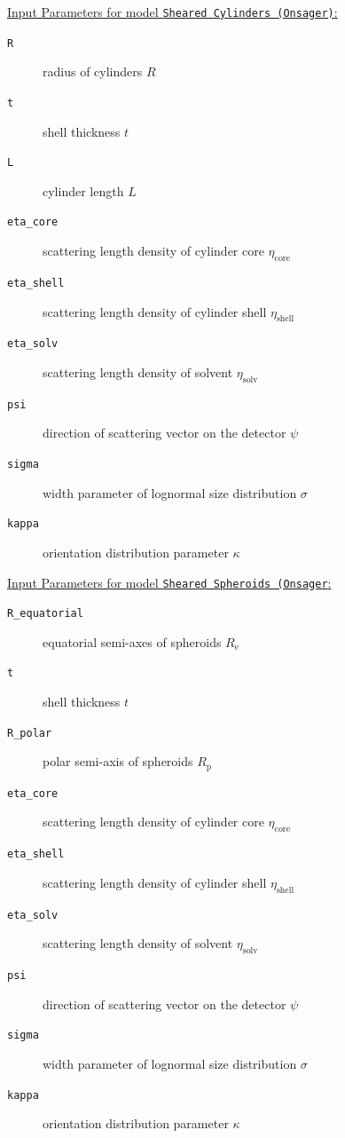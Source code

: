 \vspace{5mm}

\underline{Input Parameters for model \texttt{Sheared Cylinders (Onsager)}:}\\
\begin{description}
\item[\texttt{R}] radius of cylinders $R$
\item[\texttt{t}] shell thickness $t$
\item[\texttt{L}] cylinder length $L$
\item[\texttt{eta\_core}] scattering length density of cylinder core $\eta_\mathrm{core}$
\item[\texttt{eta\_shell}] scattering length density of cylinder shell $\eta_\mathrm{shell}$
\item[\texttt{eta\_solv}] scattering length density of solvent $\eta_\mathrm{solv}$
\item[\texttt{psi}] direction of scattering vector on the detector $\psi$
\item[{\texttt{sigma}}] width parameter of lognormal size distribution $\sigma$
\item[{\texttt{kappa}}] orientation distribution parameter $\kappa$
\end{description}

\vspace{5mm}

\underline{Input Parameters for model \texttt{Sheared Spheroids (Onsager}:}\\
\begin{description}
\item[\texttt{R\_equatorial}] equatorial semi-axes of spheroids $R_\mathrm{e}$
\item[\texttt{t}] shell thickness $t$
\item[\texttt{R\_polar}] polar semi-axis of spheroids $R_\mathrm{p}$
\item[\texttt{eta\_core}] scattering length density of cylinder core $\eta_\mathrm{core}$
\item[\texttt{eta\_shell}] scattering length density of cylinder shell $\eta_\mathrm{shell}$
\item[\texttt{eta\_solv}] scattering length density of solvent $\eta_\mathrm{solv}$
\item[\texttt{psi}] direction of scattering vector on the detector $\psi$
\item[{\texttt{sigma}}] width parameter of lognormal size distribution $\sigma$
\item[{\texttt{kappa}}] orientation distribution parameter $\kappa$
\end{description}

